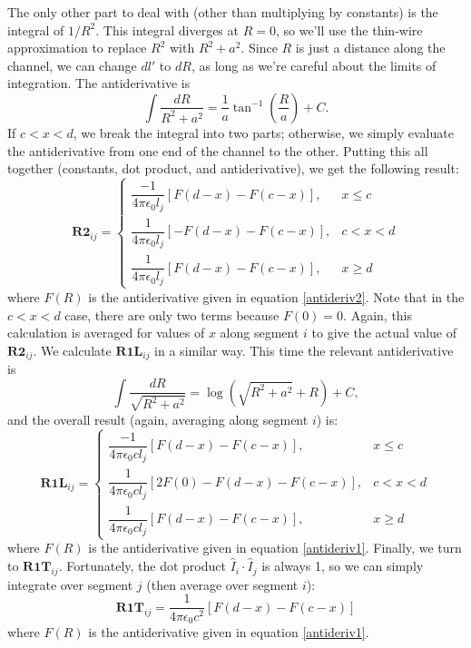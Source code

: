 \documentclass{article}
\newcommand{\mat}{\mathbf}
\begin{document}
The only other part to deal with (other than multiplying by constants) is the integral of $1/R^2$. This integral diverges at $R=0$, so we'll use the thin-wire approximation to replace $R^2$ with $R^2+a^2$. Since $R$ is just a distance along the channel, we can change $dl'$ to $dR$, as long as we're careful about the limits of integration. The antiderivative is
\begin{equation}
\label{antideriv2}
\int \frac{dR}{R^2 + a^2} = \frac{1}{a}\tan^{-1}\left(\frac{R}{a}\right) + C.
\end{equation}
If $c<x<d$, we break the integral into two parts; otherwise, we simply evaluate the antiderivative from one end of the channel to the other. Putting this all together (constants, dot product, and antiderivative), we get the following result:
\begin{equation}
\mat{R2}_{ij} = \begin{cases}
\dfrac{-1}{4\pi\epsilon_0l_j} \left[F(d-x)-F(c-x)\right], & x \leq c \\[1em]
\dfrac{1}{4\pi\epsilon_0l_j} \left[-F(d-x)-F(c-x)\right], & c<x<d \\[1em]
\dfrac{1}{4\pi\epsilon_0l_j} \left[F(d-x)-F(c-x)\right], & x \geq d
\end{cases}
\end{equation}
where $F(R)$ is the antiderivative given in equation \ref{antideriv2}. Note that in the $c<x<d$ case, there are only two terms because $F(0)=0$. Again, this calculation is averaged for values of $x$ along segment $i$ to give the actual value of $\mat{R2}_{ij}$. We calculate $\mat{R1L}_{ij}$ in a similar way. This time the relevant antiderivative is
\begin{equation}
\label{antideriv1}
\int \frac{dR}{\sqrt{R^2+a^2}} = \log\left(\sqrt{R^2+a^2}+R\right) + C,
\end{equation}
and the overall result (again, averaging along segment $i$) is:
\begin{equation}
\mat{R1L}_{ij} = \begin{cases}
\dfrac{-1}{4\pi\epsilon_0c l_j} \left[F(d-x)-F(c-x)\right], & x \leq c \\[1em]
\dfrac{1}{4\pi\epsilon_0c l_j} \left[2 F(0)-F(d-x)-F(c-x)\right], & c<x<d \\[1em]
\dfrac{1}{4\pi\epsilon_0c l_j} \left[F(d-x)-F(c-x)\right], & x \geq d
\end{cases}
\end{equation}
where $F(R)$ is the antiderivative given in equation \ref{antideriv1}. Finally, we turn to $\mat{R1T}_{ij}$. Fortunately, the dot product $\hat{I}_i\cdot\hat{I}_j$ is always 1, so we can simply integrate over segment $j$ (then average over segment $i$):
\begin{equation}
\mat{R1T}_{ij} = \frac{1}{4\pi\epsilon_0c^2} \left[F(d-x)-F(c-x)\right]
\end{equation}
where $F(R)$ is the antiderivative given in equation \ref{antideriv1}.
\end{document}

